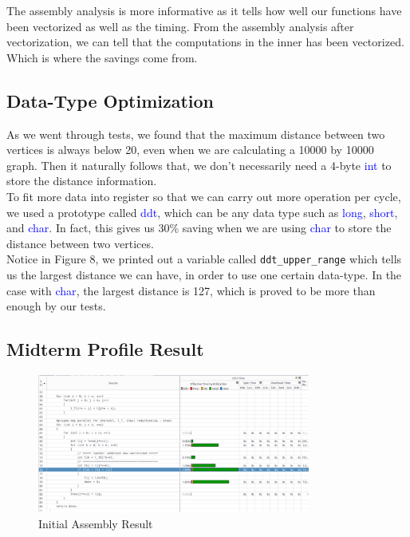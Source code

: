 The assembly analysis is more informative as it tells how well our functions have been vectorized
as well as the timing. From the assembly analysis after vectorization, we can tell that the computations
in the inner has been vectorized. Which is where the savings come from.



\subsection{Data-Type Optimization}
As we went through tests, we found that the maximum distance between two vertices is
always below 20, even when we are calculating a 10000 by 10000 graph. Then it naturally
follows that, we don't necessarily need a 4-byte \textcolor{blue}{int} to store the
distance information. \\

To fit more data into register so that we can carry out more operation per cycle, we used
a prototype called \textcolor{blue}{ddt}, which can be any data type such as \textcolor{blue}{long},
\textcolor{blue}{short}, and \textcolor{blue}{char}. In fact, this gives us 30\% saving when we are
using \textcolor{blue}{char} to store the distance between two vertices. \\

Notice in Figure 8, we printed out a variable called \texttt{ddt\_upper\_range} which tells us the largest
distance we can have, in order to use one certain data-type. In the case with \textcolor{blue}{char}, the
largest distance is 127, which is proved to be more than enough by our tests.



\subsection{Midterm Profile Result}

\begin{figure}[H]
    \centering
    \includegraphics[width=0.8\textwidth]{figs/2_assembly.png}
    \caption{Initial Assembly Result}
    \label{ddt_profile_result_1}
\end{figure}

